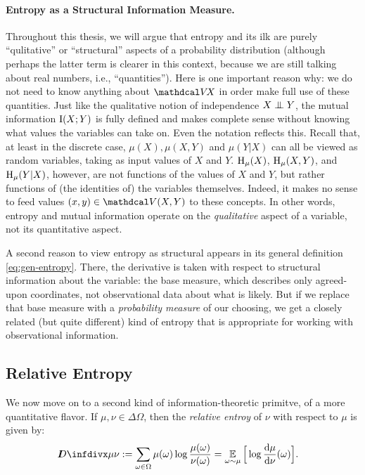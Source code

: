 \paragraph{Entropy as a Structural Information Measure.} 
Throughout this thesis, we will argue that entropy and its ilk are purely ``qulitative'' or ``structural'' aspects of a probability distribution (although perhaps the latter term is clearer in this context, because we are still talking about real numbers, i.e., ``quantities''). 
Here is one important reason why: 
    we do not need to know anything about $\V\!X$ in order make full use of these quantities.
Just like the qualitative notion of independence $X \mathrel{\perp\mspace{-10mu}\perp} Y$, the mutual information $\operatorname{\mathrm{I}}(X;Y)$ is fully defined and makes complete sense without knowing what values the variables can take on.
Even the notation reflects this. 
Recall that, at least in the discrete case, $\mu(X), \mu(X,Y)$ and $\mu(Y|X)$ can all be viewed as random variables, taking as input values of $X$ and $Y$. 
$\operatorname{\mathrm{H}}_\mu(X)$, $\operatorname{\mathrm{H}}_\mu(X,Y)$, and $\operatorname{\mathrm{H}}_\mu(Y|X)$, however, 
    are not functions of the values of $X$ and $Y$, but rather functions of (the identities of) the variables themselves. 
Indeed, it makes no sense to feed values $(x,y) \in \V(X,Y)$ to these concepts.
In other words, entropy and mutual information operate on the \emph{qualitative} aspect of a variable, not its quantitative aspect. 

A second reason to view entropy as structural appears in its general definition \eqref{eq:gen-entropy}.
There, the derivative is taken with respect to structural information about the variable: the base measure, which describes only agreed-upon coordinates, not observational data about what is likely. 
But if we replace that base measure with a \emph{probability measure} of our choosing, we get a closely related (but quite different) kind of entropy that is appropriate for working with observational information. 


\subsection{Relative Entropy}
    \label{sec:relent-primer}

We now move on to a second kind of information-theoretic primitve, of a more quantitative flavor.
If $\mu, \nu \in \Delta \Omega$, then the \emph{relative entroy} of $\nu$ with respect to $\mu$ is given by:
%
\begin{align*}
    \kldiv {\mu} {\nu} 
    &:= \sum_{ \omega \in \Omega } \mu(\omega) \log \frac{ \mu(\omega) }{ \nu(\omega) }
    = \Ex_{\omega \sim \mu} \Big[ \log \frac{\mathrm d \mu}{\mathrm d \nu}(\omega) \Big].
\end{align*}

